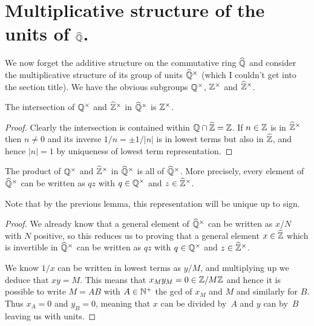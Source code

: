 \section{Multiplicative structure of the units of \texorpdfstring{$\widehat{\mathbb{Q}}$}{Qhat}.}

We now forget the additive structure on the commutative ring $\widehat{\mathbb{Q}}$ and consider
the multiplicative structure of its group of units $\widehat{\mathbb{Q}}^\times$ (which I couldn't
get into the section title). We have the obvious
subgroups $\mathbb{Q}^\times$, $\mathbb{Z}^\times$ and $\widehat{\mathbb{Z}}^\times$.

\begin{lemma}
    \label{Qhat.unitsrat_meet_unitszHat} 
    \leanok
    The intersection of $\mathbb{Q}^\times$ and $\widehat{\mathbb{Z}}^\times$ in $\widehat{\mathbb{Q}}^\times$ is $\mathbb{Z}^\times$.
\end{lemma}
\begin{proof}
    Clearly the intersection is contained within $\mathbb{Q}\cap\widehat{\mathbb{Z}}=\mathbb{Z}$. If $n\in\mathbb{Z}$ is in $\widehat{\mathbb{Z}}^\times$
    then $n\not=0$ and its inverse $1/n=\pm1/|n|$ is in lowest terms but also in $\widehat{\mathbb{Z}}$,
    and hence $|n|=1$ by uniqueness of lowest term representation.
\end{proof}

\begin{lemma}
    \label{QHat.unitsrat_join_unitszHat}
    \leanok
    The product of $\mathbb{Q}^\times$ and $\widehat{\mathbb{Z}}^\times$ in $\widehat{\mathbb{Q}}^\times$ is all of $\widehat{\mathbb{Q}}^\times$.
    More precisely, every element of $\widehat{\mathbb{Q}}^\times$ can be written as $qz$ with $q\in\mathbb{Q}^\times$
    and $z\in\widehat{\mathbb{Z}}^\times$. 
\end{lemma}
Note that by the previous lemma, this representation will be unique up to sign.
\begin{proof}
  We already know that a general element of $\widehat{\mathbb{Q}}^\times$ can be written as $x/N$ with $N$
  positive, so this reduces us to proving that a general element $x\in\widehat{\mathbb{Z}}$ which is invertible
  in $\widehat{\mathbb{Q}}^\times$ can be written as $qz$ with $q\in\mathbb{Q}^\times$ and $z\in\widehat{\mathbb{Z}}^\times$.

  We know $1/x$ can be written in lowest terms as $y/M$, and multiplying up we deduce
  that $xy=M$. This means that $x_My_M=0\in\mathbb{Z}/M\mathbb{Z}$ and hence it is possible to write
  $M=AB$ with $A\in\mathbb{N}^+$ the gcd of $x_M$ and $M$ and similarly for $B$. Thus $x_A=0$
  and $y_B=0$, meaning that $x$ can be divided by~$A$ and $y$ can by~$B$ leaving us with
  units.
\end{proof}





